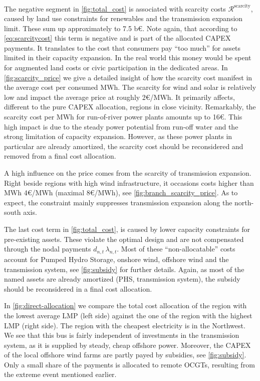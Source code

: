 \documentclass[11pt,twocolumn]{article}
\newcommand{\lmp}[1][n]{\lambda_{#1,t}}
\newcommand{\demand}[1][n]{d_{#1,t}}
\newcommand{\remainingcost}{\mathcal{R}}
\newcommand{\scarcitycost}{\remainingcost^\text{scarcity}}
\begin{document}
The negative segment in \cref{fig:total_cost} is associated with scarcity costs $\scarcitycost$, caused by land use constraints for renewables and the transmission expansion limit. These sum up approximately to 7.5 b\euro. Note again, that according to \cref{eq:scarcitycost} this term is negative and is part of the allocated CAPEX payments. It translates to the cost that consumers pay ``too much'' for assets limited in their capacity expansion. In the real world this money would be spent for augmented land costs or civic participation in the dedicated areas. In \cref{fig:scarcity_price} we give a detailed insight of how the scarcity cost manifest in the average cost per consumed MWh. The scarcity for wind and solar is relatively low and impact the average price at roughly 2\euro/MWh. It primarily affects, different to the pure CAPEX allocation, regions in close vicinity. Remarkably, the scarcity cost per MWh for run-of-river power plants amounts up to 16\euro. This high impact is due to the steady power potential from run-off water and the strong limitation of capacity expansion. However, as these power plants in particular are already amortized, the scarcity cost should be reconsidered and removed from a final cost allocation. 

A high influence on the price comes from the scarcity of transmission expansion. Right beside regions with high wind infrastructure, it occasions costs higher than MWh 4\euro/MWh (maximal 8\euro/MWh), see \cref{fig:branch_scarcity_price}. As to expect, the constraint mainly suppresses transmission expansion along the north-south axis.   


The last cost term in \cref{fig:total_cost}, is  caused by lower capacity constraints for pre-existing assets. These violate the optimal design and are not compensated through the nodal payments $\demand \, \lmp$. Most of these ``non-allocatable'' costs account for Pumped Hydro Storage, onshore wind, offshore wind and the transmission system, see \cref{fig:subsidy} for further details. Again, as most of the named assets are already amortized (PHS, transmission system), the subsidy should be reconsidered in a final cost allocation. 


In \cref{fig:direct-allocation} we compare the total cost allocation of the region with the lowest average LMP (left side) against the one of the region with the highest LMP (right side). The region with the cheapest electricity is in the Northwest. We see that this bus is fairly independent of investments in the transmission system, as it is supplied by steady, cheap offshore power. Moreover, the CAPEX of the local offshore wind farms are partly payed by subsidies, see \cref{fig:subsidy}. Only a small share of the payments is allocated to remote OCGTs, resulting from the extreme event mentioned earlier. 
\end{document}
